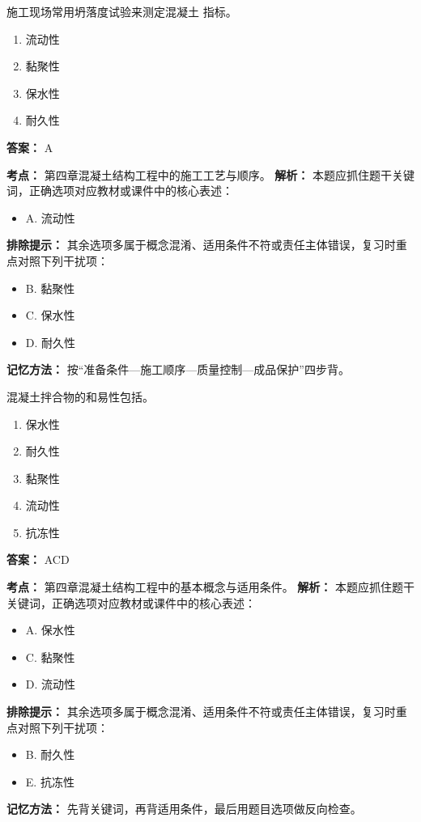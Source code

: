 \documentclass[UTF8,fontset=fandol,11pt]{ctexart}
\begin{document}
\begin{quizbox}[title={第 56 题}]
施工现场常用坍落度试验来测定混凝土 指标。\\
\begin{enumerate}[label=\Alph*.]
\item 流动性
\item 黏聚性
\item 保水性
\item 耐久性
\end{enumerate}
\textbf{答案：} A
\vspace{0.25em}
\begin{answerbox}[title={考点解析}]
\textbf{考点：} 第四章混凝土结构工程中的施工工艺与顺序。
\textbf{解析：} 本题应抓住题干关键词，正确选项对应教材或课件中的核心表述：
\begin{itemize}
\item A. 流动性
\end{itemize}
\textbf{排除提示：} 其余选项多属于概念混淆、适用条件不符或责任主体错误，复习时重点对照下列干扰项：
\begin{itemize}
\item B. 黏聚性
\item C. 保水性
\item D. 耐久性
\end{itemize}
\textbf{记忆方法：} 按“准备条件—施工顺序—质量控制—成品保护”四步背。
\end{answerbox}
\end{quizbox}

\vspace{0.2em}

\begin{quizbox}[title={第 57 题}]
混凝土拌合物的和易性包括。\\
\begin{enumerate}[label=\Alph*.]
\item 保水性
\item 耐久性
\item 黏聚性
\item 流动性
\item 抗冻性
\end{enumerate}
\textbf{答案：} ACD
\vspace{0.25em}
\begin{answerbox}[title={考点解析}]
\textbf{考点：} 第四章混凝土结构工程中的基本概念与适用条件。
\textbf{解析：} 本题应抓住题干关键词，正确选项对应教材或课件中的核心表述：
\begin{itemize}
\item A. 保水性
\item C. 黏聚性
\item D. 流动性
\end{itemize}
\textbf{排除提示：} 其余选项多属于概念混淆、适用条件不符或责任主体错误，复习时重点对照下列干扰项：
\begin{itemize}
\item B. 耐久性
\item E. 抗冻性
\end{itemize}
\textbf{记忆方法：} 先背关键词，再背适用条件，最后用题目选项做反向检查。
\end{answerbox}
\end{quizbox}
\end{document}
